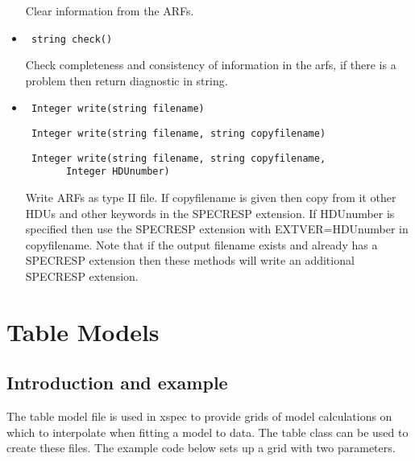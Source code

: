 \documentclass[11pt]{book}
\begin{document}
\begin{itemize}
           Clear information from the ARFs.

\item    \begin{verbatim} string check() \end{verbatim}

           Check completeness and consistency of information in the arfs,
           if there is a problem then return diagnostic in string.

\item  \begin{verbatim} Integer write(string filename) \end{verbatim}
       \begin{verbatim} Integer write(string filename, string copyfilename) \end{verbatim}
       \begin{verbatim} Integer write(string filename, string copyfilename,
       Integer HDUnumber) \end{verbatim}

          Write ARFs as type II file. If copyfilename is given then
          copy from it other HDUs and other keywords in the SPECRESP
          extension. If HDUnumber is specified then use the SPECRESP
          extension with EXTVER=HDUnumber in copyfilename. Note that 
          if the output filename exists and already has a SPECRESP 
          extension then these methods will write an additional 
          SPECRESP extension.




%
%

\end{itemize}


\section{Table Models}

\subsection{Introduction and example}

The table model file is used in xspec to provide grids of model
calculations on which to interpolate when fitting a model to data. The
table class can be used to create these files. The example code below
sets up a grid with two parameters.
\end{document}
